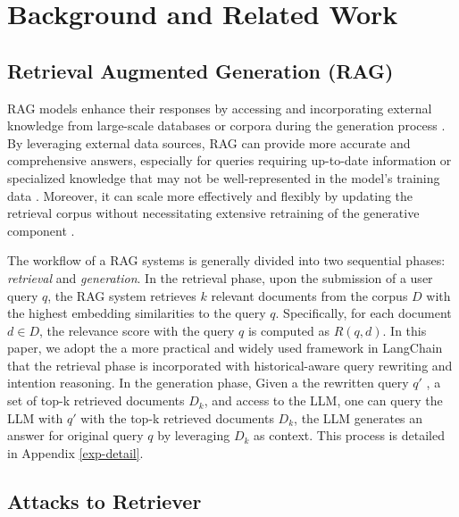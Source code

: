 \section{Background and Related Work}


\subsection{Retrieval Augmented Generation (RAG)}
RAG models enhance their responses by accessing and incorporating external knowledge from large-scale databases or corpora during the generation process \cite{lewis2020retrieval,shi2025know,liu2023webglm}. By leveraging external data sources, RAG can provide more accurate and comprehensive answers, especially for queries requiring up-to-date information or specialized knowledge that may not be well-represented in the model's training data \cite{siyue2024mrag}. Moreover, it can scale more effectively and flexibly by updating the retrieval corpus without necessitating extensive retraining of the generative component \cite{gao2023retrieval,wu2024retrieval}.


The workflow of a RAG systems is generally divided into two sequential phases: \textit{retrieval} and \textit{generation}. 
In the retrieval phase, upon the submission of a user query $q$, the RAG system retrieves $k$ relevant documents from the corpus $D$ with the highest embedding similarities to the query $q$. Specifically, for each document $d \in D$, the relevance score with the query $q$ is computed as $R(q, d)$. In this paper, we adopt the a more practical and widely used framework in LangChain that the retrieval phase is incorporated with historical-aware query rewriting and intention reasoning. 
In the generation phase, Given a the rewritten query $q'$ , a set of top-k retrieved documents $D_k$, and access to the LLM, one can query the LLM with $q'$ with the top-k retrieved documents $D_k$, the LLM generates an answer for original query $q$ by leveraging $D_k$ as context. This process is detailed in Appendix \ref{exp-detail}.

\subsection{Attacks to Retriever}

